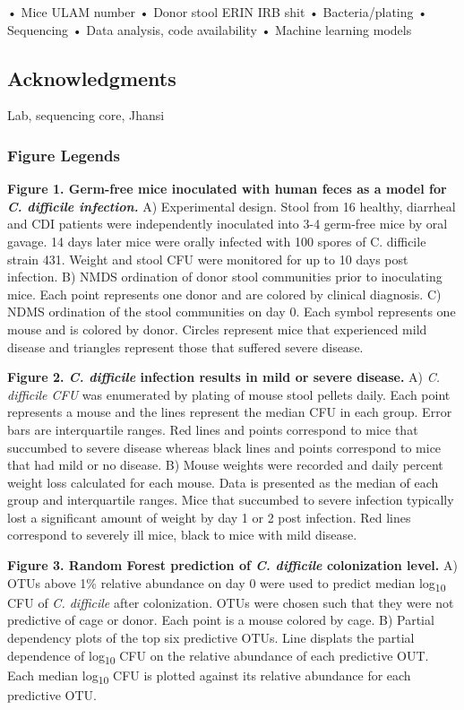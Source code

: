 \documentclass[]{article}
\begin{document}
• Mice ULAM number • Donor stool ERIN IRB shit • Bacteria/plating •
Sequencing • Data analysis, code availability • Machine learning models

\subsection{Acknowledgments}\label{acknowledgments}

Lab, sequencing core, Jhansi

\newpage

\subsubsection{Figure Legends}\label{figure-legends}

\textbf{Figure 1. Germ-free mice inoculated with human feces as a model
for \emph{C. difficile infection.}} A) Experimental design. Stool from
16 healthy, diarrheal and CDI patients were independently inoculated
into 3-4 germ-free mice by oral gavage. 14 days later mice were orally
infected with 100 spores of C. difficile strain 431. Weight and stool
CFU were monitored for up to 10 days post infection. B) NMDS ordination
of donor stool communities prior to inoculating mice. Each point
represents one donor and are colored by clinical diagnosis. C) NDMS
ordination of the stool communities on day 0. Each symbol represents one
mouse and is colored by donor. Circles represent mice that experienced
mild disease and triangles represent those that suffered severe disease.

\textbf{Figure 2. \emph{C. difficile} infection results in mild or
severe disease.} A) \emph{C. difficile CFU} was enumerated by plating of
mouse stool pellets daily. Each point represents a mouse and the lines
represent the median CFU in each group. Error bars are interquartile
ranges. Red lines and points correspond to mice that succumbed to severe
disease whereas black lines and points correspond to mice that had mild
or no disease. B) Mouse weights were recorded and daily percent weight
loss calculated for each mouse. Data is presented as the median of each
group and interquartile ranges. Mice that succumbed to severe infection
typically lost a significant amount of weight by day 1 or 2 post
infection. Red lines correspond to severely ill mice, black to mice with
mild disease.

\textbf{Figure 3. Random Forest prediction of \emph{C. difficile}
colonization level.} A) OTUs above 1\% relative abundance on day 0 were
used to predict median log\textsubscript{10} CFU of \emph{C. difficile}
after colonization. OTUs were chosen such that they were not predictive
of cage or donor. Each point is a mouse colored by cage. B) Partial
dependency plots of the top six predictive OTUs. Line displats the
partial dependence of log\textsubscript{10} CFU on the relative
abundance of each predictive OUT. Each median log\textsubscript{10} CFU
is plotted against its relative abundance for each predictive OTU.
\end{document}

